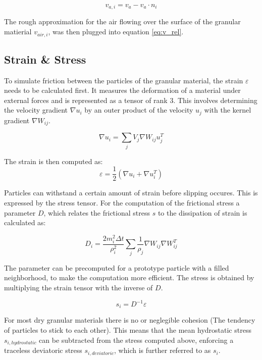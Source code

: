 \documentclass[intern]{cgMA}
\begin{document}
    \begin{equation}
        v_{a, i} = v_{a} - v_{a} \cdot n_i
    \end{equation}

    The rough approximation for the air flowing over the surface of the granular matierial $v_{air, i}$, was then plugged into equation \ref{eq:v_rel}.

    \subsection{Strain \& Stress}
    
    To simulate friction between the particles of the granular material, the strain $\varepsilon$ needs to be calculated first. It measures the deformation of a material under external forces and is represented as a tensor of rank 3. This involves determining the velocity gradient $\nabla u_i$ by an outer product of the velocity $u_j$ with the kernel gradient $\nabla W_{ij}$. 
    
    \begin{equation}
        \nabla u_i = \sum_j V_j \nabla W_{ij} u_j^T
    \end{equation}

    The strain is then computed as:
    \begin{equation}
        \varepsilon = \frac{1}{2} (\nabla u_i + \nabla u_i^T)
    \end{equation}

    Particles can withstand a certain amount of strain before slipping occures. This is expressed by the stress tensor. For the computation of the frictional stress a parameter $D$, which relates the frictional stress $s$ to the dissipation of strain is calculated as:

    \begin{equation}
        D_i = \frac{2 m_i^2 \Delta t}{\rho_i^2} \sum_j \frac{1}{\rho_j} \nabla W_{ij}  \nabla W_{ij}^T
    \end{equation}
    
    The parameter can be precomputed for a prototype particle with a filled neighborhood, to make the computation more efficient.
    The stress is obtained by multiplying the strain tensor with the inverse of $D$. 
    
    \begin{equation}
        s_i = D^{-1} \varepsilon
    \end{equation}

    For most dry granular materials there is no or neglegible cohesion (The tendency of particles to stick to each other). This means that the mean hydrostatic stress $s_{i, hydrostatic}$ can be subtracted from the stress computed above, enforcing a traceless deviatoric stress $s_{i, deviatoric}$, which is further referred to as $s_i$. 
\end{document}
